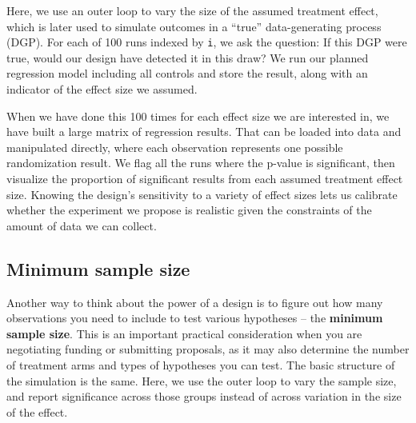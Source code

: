 Here, we use an outer loop to vary the size of the assumed treatment effect,
which is later used to simulate outcomes in a ``true''
data-generating process (DGP).
For each of 100 runs indexed by \texttt{i},
we ask the question: If this DGP were true,
would our design have detected it in this draw?
We run our planned regression model including all controls and store the result,
along with an indicator of the effect size we assumed.

When we have done this 100 times for each effect size we are interested in,
we have built a large matrix of regression results.
That can be loaded into data and manipulated directly,
where each observation represents one possible randomization result.
We flag all the runs where the p-value is significant,
then visualize the proportion of significant results
from each assumed treatment effect size.
Knowing the design's sensitivity to a variety of effect sizes
lets us calibrate whether the experiment we propose
is realistic given the constraints of the amount of data we can collect.

{
}

\subsection{Minimum sample size}

Another way to think about the power of a design
is to figure out how many observations you need to include
to test various hypotheses -- the \textbf{minimum sample size}.
This is an important practical consideration
when you are negotiating funding or submitting proposals,
as it may also determine the number of treatment arms
and types of hypotheses you can test.
The basic structure of the simulation is the same.
Here, we use the outer loop to vary the sample size,
and report significance across those groups
instead of across variation in the size of the effect.

{
}

